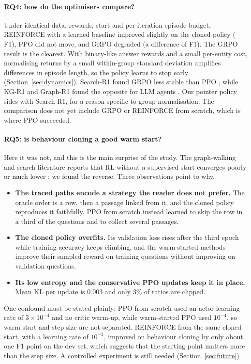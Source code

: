 \paragraph{RQ4: how do the optimisers compare?} Under identical data, rewards, start and per-iteration episode budget, REINFORCE with a learned baseline improved slightly on the cloned policy (\dReinforceBc{} F1), PPO did not move, and GRPO degraded (a difference of \dGrpoBc{} F1). The GRPO result is the clearest. With binary-like answer rewards and a small per-entity cost, normalising returns by a small within-group standard deviation amplifies differences in episode length, so the policy learns to stop early (Section~\ref{sec:dynamics}). Search-R1 found GRPO less stable than PPO \citep{jin2025searchr1}, while KG-R1 and Graph-R1 found the opposite for LLM agents \citep{lin2025kgr1,luo2026graphr1}. Our pointer policy sides with Search-R1, for a reason specific to group normalisation. The comparison does not yet include GRPO or REINFORCE from scratch, which is where PPO succeeded.

\paragraph{RQ5: is behaviour cloning a good warm start?} Here it was not, and this is the main surprise of the study. The graph-walking and search literature reports that RL without a supervised start converges poorly or much lower \citep{xiong2017deeppath,sun2026sogr1}; we found the reverse. Three observations point to why.
\begin{itemize}
  \item \textbf{The traced paths encode a strategy the reader does not prefer.} The oracle order is a row, then a passage linked from it, and the cloned policy reproduces it faithfully. PPO from scratch instead learned to skip the row in a third of the questions and to collect several passages.
  \item \textbf{The cloned policy overfits.} Its validation loss rises after the third epoch while training accuracy keeps climbing, and the warm-started methods improve their sampled reward on training questions without improving on validation questions.
  \item \textbf{Its low entropy and the conservative PPO updates keep it in place.} Mean KL per update is 0.003 and only 3\% of ratios are clipped.
\end{itemize}
One confound must be stated plainly: PPO from scratch used an actor learning rate of $3\times10^{-4}$ and no critic warm-up, while warm-started PPO used $10^{-4}$, so warm start and step size are not separated. REINFORCE from the same cloned start, with a learning rate of $10^{-3}$, improved on behaviour cloning by only about one F1 point on the dev set, which suggests that the starting point matters more than the step size. A controlled experiment is still needed (Section~\ref{sec:future}).

